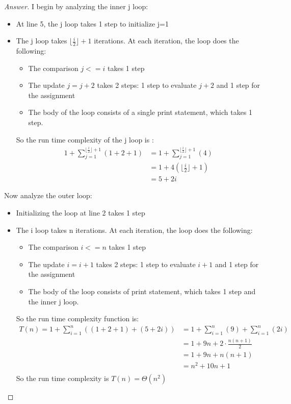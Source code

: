 \documentclass[11pt]{article}
\theoremstyle{definition}
\theoremstyle{definition}
\theoremstyle{definition}
\begin{document}
\begin{proof}[Answer]

I begin by analyzing the inner j loop:
\begin{itemize}
\item At line 5, the j loop takes 1 step to initialize j=1
\item The j loop takes $\lfloor \frac{i}{2} \rfloor +1$ iterations. At each iteration, the loop does the following:
	\begin{itemize}
	\item The comparison $j<=i$ takes 1 step
	\item The update $j=j+2$ takes 2 steps:  1 step to evaluate $j+2$ and 1 step for the assignment 
	\item The body of the loop consists of a single print statement, which takes 1 step. 
	\end{itemize}
So the run time complexity of the j loop is :
\begin{align*} 
1+ \sum_{j=1}^{\lfloor \frac{i}{2} \rfloor +1} (1+2+1)  &= 1+ \sum_{j=1}^{\lfloor \frac{i}{2} \rfloor +1} (4) \\
&= 1+ 4{(\lfloor \frac{i}{2} \rfloor +1)}\\
&= 5 + 2i
\end{align*}
\end{itemize}

Now analyze the outer loop:
\begin{itemize}
\item Initializing the loop at line 2 takes 1 step
\item The i loop takes n iterations. At each iteration, the loop does the following:
	\begin{itemize}
	\item The comparison $i<=n$ takes 1 step
	\item The update $i=i+1$ takes 2 steps:  1 step to evaluate $i+1$ and 1 step for the assignment 
	\item The body of the loop consists of print statement, which takes 1 step and the inner j loop. 
	\end{itemize}
So the run time complexity function is:
\begin{align*} 
T(n)= 1+ \sum_{i=1}^{n} ((1+2+1) +(5+2i)) &= 1+ \sum_{i=1}^{n} (9) + \sum_{i=1}^{n} (2i) \\
 &= 1+9n + 2\cdot\frac{n(n+1)}{2}\\
 &= 1+9n + n(n+1)\\
 &= n^2+10n+1\\
\end{align*}
So the run time complexity is $T(n) = \Theta(n^2)$
\end{itemize}

\end{proof}
\end{document}
